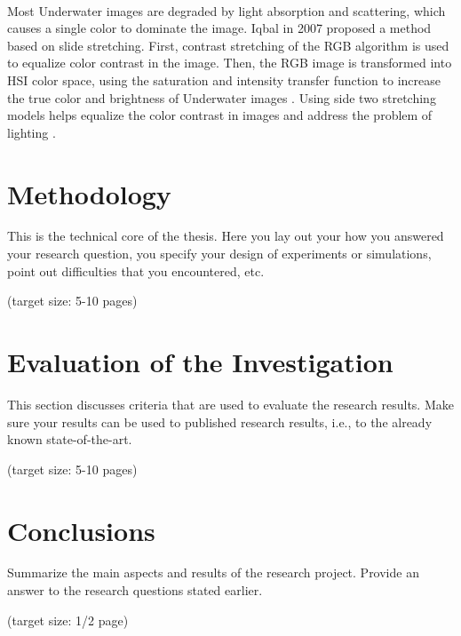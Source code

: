 \documentclass[a4paper,11pt,oneside]{article}
\begin{document}
  \\
  Most Underwater images are degraded by light absorption and scattering, which causes a single color to dominate the image. Iqbal in 2007 \cite{4} proposed a method based on slide stretching. First, contrast stretching of the RGB algorithm is used to equalize color contrast in the image. Then, the RGB image is transformed into HSI color space, using the saturation and intensity transfer function to increase the true color and brightness of Underwater images \cite{4}. Using side two stretching models helps equalize the color contrast in images and address the problem of lighting \cite{4}.
 
  \section{Methodology}
  \label{sec:3}
  This is the technical core of the thesis. Here you lay out your how
  you answered your research question, you specify your design of
  experiments or simulations, point out difficulties that you
  encountered, etc.

  (target size: 5-10 pages)
  
  \section{Evaluation of the Investigation}
  \label{sec:4}

  This section discusses criteria that are used to evaluate the
  research results. Make sure your results can be used to published
  research results, i.e., to the already known state-of-the-art.

  (target size: 5-10 pages)


\section{Conclusions}
\label{sec:5}

  Summarize the main aspects and results of the research
  project. Provide an answer to the research questions stated earlier.

  (target size: 1/2 page)
  
  \newpage
  
  \printbibliography
  
\end{document}
